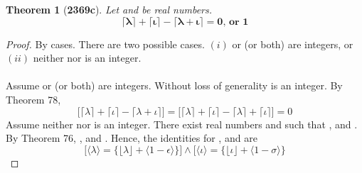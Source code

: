 \documentclass[preview]{standalone}
\newtheorem{theorem}{Theorem}
\begin{document}
\begin{theorem}[\textbf{2369c}]
    Let \bm{$\lambda$} and \bm{$\iota$} be real numbers. 
    \begin{equation*}
        \bm{
            \lceil \lambda \rceil 
                + 
            \lceil \iota \rceil 
                - 
            \lceil \lambda + \iota \rceil 
                = 
            0
                \textbf{, or } 
            1
        }
    \end{equation*}
\end{theorem}

\begin{proof}
    By cases. 
    There are two possible cases. 
    $(i)$ \bm{$\lambda$} or \bm{$\iota$} (or both) are integers, 
    or $(ii)$ neither \bm{$\lambda$} nor \bm{$\iota$} is an integer.
    \\ \\
     Assume \bm{$\lambda$} or \bm{$\iota$} (or both) are integers. 
    Without loss of generality \bm{$\iota$} is an integer.
    By Theorem 78, 
    \begin{equation*}
        \Big[ 
            \lceil \lambda \rceil 
                + 
            \lceil \iota \rceil 
                - 
            \lceil \lambda + \iota \rceil 
        \Big]
            = 
        \Big[ 
            \lceil \lambda \rceil 
                + 
            \lceil \iota \rceil 
                - 
            \lceil \lambda \rceil 
                + 
            \lceil \iota \rceil 
        \Big]
            = 
        0
    \end{equation*}
     Assume neither \bm{$\lambda$} nor \bm{$\iota$} is an integer. 
    There exist real numbers \bm{$\epsilon$} and \bm{$\sigma$} such that 
    \bm{$\lceil \lambda \rceil - \lambda = \epsilon$},
    and \bm{$\lceil \iota \rceil - \iota = \sigma$}. 
    By Theorem 76, 
    , 
    and . 
    Hence, the identities for \bm{$\lambda$}, and \bm{$\iota$} are
    \begin{equation*}
        \bigg[
            \Big \langle \lambda \Big \rangle 
                = 
            \Big\{ 
                \lfloor \lambda \rfloor + \big \langle 1 - \epsilon \big \rangle 
            \Big\}
        \bigg]
            \land
        \bigg[ 
            \Big \langle \iota \Big \rangle 
                = 
            \Big\{ 
                \lfloor \iota \rfloor + \big \langle 1 - \sigma \big \rangle
            \Big\}

\end{equation*}
\end{proof}
\end{document}
